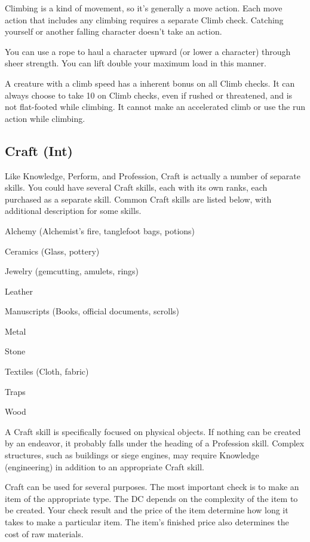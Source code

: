  Climbing is a kind of movement, so it's generally a move action. Each move action that includes any climbing requires a separate Climb check. Catching yourself or another falling character doesn't take an action.

 You can use a rope to haul a character upward (or lower a character) through sheer strength. You can lift double your maximum load in this manner.

\par A creature with a climb speed has a  inherent bonus on all Climb checks. It can always choose to take 10 on Climb checks, even if rushed or threatened, and is not flat-footed while climbing. It cannot make an accelerated climb or use the run action while climbing.

\subsection{Craft (Int)}
Like Knowledge, Perform, and Profession, Craft is actually a number of separate skills. You could have several Craft skills, each with its own ranks, each purchased as a separate skill. Common Craft skills are listed below, with additional description for some skills.

\begin{itemize*}
  \item Alchemy (Alchemist's fire, tanglefoot bags, potions)
  \item Ceramics (Glass, pottery)
  \item Jewelry (gemcutting, amulets, rings)
  \item Leather
  \item Manuscripts (Books, official documents, scrolls)
  \item Metal
  \item Stone
  \item Textiles (Cloth, fabric)
  \item Traps
  \item Wood
\end{itemize*}

A Craft skill is specifically focused on physical objects. If nothing can be created by an endeavor, it probably falls under the heading of a Profession skill. Complex structures, such as buildings or siege engines, may require Knowledge (engineering) in addition to an appropriate Craft skill.

 Craft can be used for several purposes. The most important check is to make an item of the appropriate type. The DC depends on the complexity of the item to be created. Your check result and the price of the item determine how long it takes to make a particular item. The item's finished price also determines the cost of raw materials.

